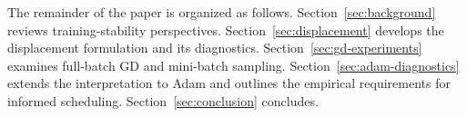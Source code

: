 The remainder of the paper is organized as follows. Section~\ref{sec:background} reviews
training-stability perspectives. Section~\ref{sec:displacement} develops the displacement formulation
and its diagnostics. Section~\ref{sec:gd-experiments} examines full-batch GD and mini-batch
sampling. Section~\ref{sec:adam-diagnostics} extends the interpretation to Adam
and outlines the empirical requirements for informed scheduling. Section~\ref{sec:conclusion} concludes.



